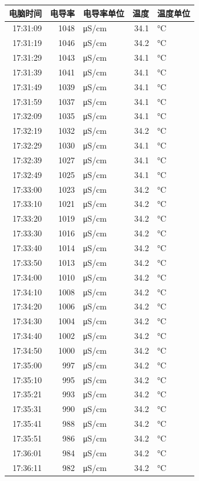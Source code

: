 \documentclass[11pt]{article}
\begin{document}
\begin{enumerate}
\begin{center}
\begin{tabular}{rrlrl}
电脑时间 & 电导率 & 电导率单位 & 温度 & 温度单位\\
\hline
17:31:09 & 1048 & μS/cm & 34.1 & °C\\
17:31:19 & 1046 & μS/cm & 34.2 & °C\\
17:31:29 & 1043 & μS/cm & 34.1 & °C\\
17:31:39 & 1041 & μS/cm & 34.1 & °C\\
17:31:49 & 1039 & μS/cm & 34.1 & °C\\
17:31:59 & 1037 & μS/cm & 34.1 & °C\\
17:32:09 & 1035 & μS/cm & 34.1 & °C\\
17:32:19 & 1032 & μS/cm & 34.2 & °C\\
17:32:29 & 1030 & μS/cm & 34.1 & °C\\
17:32:39 & 1027 & μS/cm & 34.1 & °C\\
17:32:49 & 1025 & μS/cm & 34.1 & °C\\
17:33:00 & 1023 & μS/cm & 34.2 & °C\\
17:33:10 & 1021 & μS/cm & 34.2 & °C\\
17:33:20 & 1019 & μS/cm & 34.2 & °C\\
17:33:30 & 1016 & μS/cm & 34.2 & °C\\
17:33:40 & 1014 & μS/cm & 34.2 & °C\\
17:33:50 & 1013 & μS/cm & 34.2 & °C\\
17:34:00 & 1010 & μS/cm & 34.2 & °C\\
17:34:10 & 1008 & μS/cm & 34.2 & °C\\
17:34:20 & 1006 & μS/cm & 34.2 & °C\\
17:34:30 & 1004 & μS/cm & 34.2 & °C\\
17:34:40 & 1002 & μS/cm & 34.2 & °C\\
17:34:50 & 1000 & μS/cm & 34.2 & °C\\
17:35:00 & 997 & μS/cm & 34.2 & °C\\
17:35:10 & 995 & μS/cm & 34.2 & °C\\
17:35:21 & 993 & μS/cm & 34.2 & °C\\
17:35:31 & 990 & μS/cm & 34.2 & °C\\
17:35:41 & 988 & μS/cm & 34.2 & °C\\
17:35:51 & 986 & μS/cm & 34.2 & °C\\
17:36:01 & 984 & μS/cm & 34.2 & °C\\
17:36:11 & 982 & μS/cm & 34.2 & °C\\

\end{tabular}
\end{center}
\end{enumerate}
\end{document}
